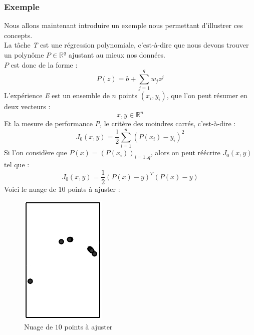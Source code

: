 \documentclass[10pt,a4paper]{report}
\begin{document}
			\subsubsection{Exemple}
			Nous allons maintenant introduire un exemple nous permettant d'illustrer ces concepts.\\
			La tâche \emph{T} est une régression polynomiale, c'est-à-dire que nous devons trouver un polynôme $P \in \mathbb{R}^{q}$ ajustant au mieux nos données.\\
			$P$ est donc de la forme :
			$$P(z) = b + \sum_{j=1}^{q}{w_j z^j}$$
			L'expérience \emph{E} est un ensemble de $n$ points $(x_i,y_i)$, que l'on peut résumer en deux vecteurs :
			$$x, y \in \mathbb{R}^n$$
			Et la mesure de performance \emph{P}, le critère des moindres carrés, c'est-à-dire :
			$$J_0(x,y) =\frac{1}{2} \sum_{i=1}^{n}{(P(x_i)-y_i)^2}$$
			Si l'on considère que $P(x) = (P(x_i))_{i=1..q}$, alors on peut réécrire $J_0(x,y)$ tel que :
			$$J_0(x,y) = \frac{1}{2} (P(x)-y)^T(P(x)-y)$$
			Voici le nuage de $10$ points à ajuster :
			\begin{figure}[H]
				\begin{center}
					\includegraphics[scale=0.5]{Images/fittingproblem.png}
					\caption{Nuage de $10$ points à ajuster}		
				\end{center}
			\end{figure}
			
\end{document}
